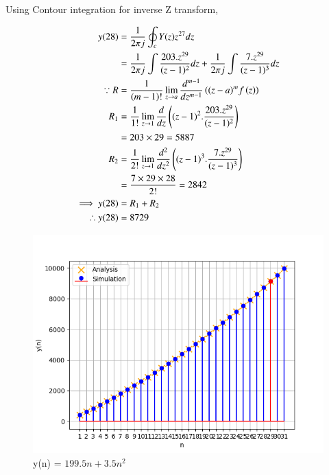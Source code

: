 \documentclass[journal,12pt,twocolumn]{IEEEtran}
\theoremstyle{remark}
\begin{document}
Using Contour integration for inverse Z transform,

\begin{align}
    y(28) &= \frac{1}{2\pi j}\oint_c Y(z) z^{27} dz \\
    &= \frac{1}{2\pi j}\int \frac{203.z^{29}}{(z-1)^{2}} dz + \frac{1}{2\pi j}\int \frac{7.z^{29}}{(z-1)^{3}} dz\\
    \because R&=\frac{1}{\left(m-1\right)!}\lim\limits_{z\to a}\frac{d^{m-1}}{dz^{m-1}}\left({(z-a)}^{m}f\left(z\right)\right)\\
    R_1 &=\frac{1}{1!}\lim\limits_{z\to 1}\frac{d}{dz}\left((z-1)^2.\frac{203.z^{29}}{(z-1)^{2}}\right)\\
    &= 203 \times 29 = 5887 \\
    R_2 &=\frac{1}{2!}\lim\limits_{z\to 1}\frac{d^2}{dz^2}\left((z-1)^3.\frac{7.z^{29}}{(z-1)^{3}}\right)\\
    &= \frac{7 \times 29 \times 28}{2!} = 2842\\
    \implies y(28) &= R_1 + R_2 \\
    \therefore y(28) &= 8729 
\end{align}

\begin{figure}[h]
  \centering
  \includegraphics[width=\columnwidth]{figs/fig1.png}
  \caption{y(n) = $199.5n + 3.5n^2$}
  \label{fig:graph}
\end{figure}
\end{document}
